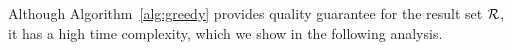 %


Although Algorithm~\ref{alg:greedy} provides quality guarantee for the result set $\mathcal{R}$, it has a high time complexity, which we show in the following analysis.



